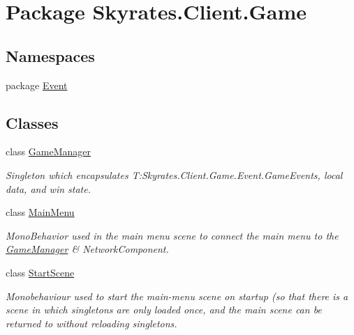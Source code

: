 \hypertarget{namespace_skyrates_1_1_client_1_1_game}{\section{Package Skyrates.\-Client.\-Game}
\label{namespace_skyrates_1_1_client_1_1_game}
}
\subsection*{Namespaces}
\begin{DoxyCompactItemize}
\item 
package \hyperlink{namespace_skyrates_1_1_client_1_1_game_1_1_event}{Event}
\end{DoxyCompactItemize}
\subsection*{Classes}
\begin{DoxyCompactItemize}
\item 
class \hyperlink{class_skyrates_1_1_client_1_1_game_1_1_game_manager}{Game\-Manager}
\begin{DoxyCompactList}\small\item\em Singleton which encapsulates T\-:\-Skyrates.\-Client.\-Game.\-Event.\-Game\-Events, local data, and win state. \end{DoxyCompactList}\item 
class \hyperlink{class_skyrates_1_1_client_1_1_game_1_1_main_menu}{Main\-Menu}
\begin{DoxyCompactList}\small\item\em Mono\-Behavior used in the main menu scene to connect the main menu to the \hyperlink{class_skyrates_1_1_client_1_1_game_1_1_game_manager}{Game\-Manager} \& Network\-Component. \end{DoxyCompactList}\item 
class \hyperlink{class_skyrates_1_1_client_1_1_game_1_1_start_scene}{Start\-Scene}
\begin{DoxyCompactList}\small\item\em Monobehaviour used to start the main-\/menu scene on startup (so that there is a scene in which singletons are only loaded once, and the main scene can be returned to without reloading singletons. \end{DoxyCompactList}\end{DoxyCompactItemize}
